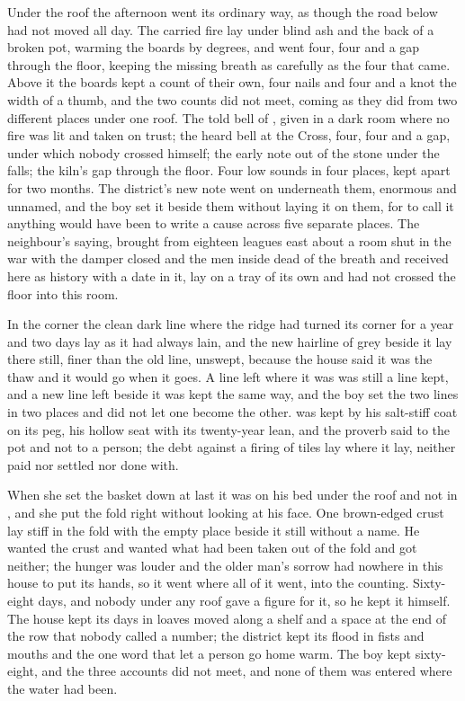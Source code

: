 \scenebreak

Under the  roof the afternoon went its ordinary way, as though the road below had not moved all day. The carried fire lay under blind ash and the back of a broken pot, warming the boards by degrees, and  went four, four and a gap through the floor, keeping the missing breath as carefully as the four that came. Above it the boards kept a count of their own, four nails and four and a knot the width of a thumb, and the two counts did not meet, coming as they did from two different places under one roof. The told bell of , given in a dark room where no fire was lit and taken on trust; the heard bell at the Cross, four, four and a gap, under which nobody crossed himself; the early note out of the stone under the falls; the kiln's gap through the floor. Four low sounds in four places, kept apart for two months. The district's new note went on underneath them, enormous and unnamed, and the boy set it beside them without laying it on them, for to call it anything would have been to write a cause across five separate places. The neighbour's saying, brought from eighteen leagues east about a room shut in the war with the damper closed and the men inside dead of the breath and received here as history with a date in it, lay on a tray of its own and had not crossed the floor into this room.

In the corner the clean dark line where the ridge had turned its corner for a year and two days lay as it had always lain, and the new hairline of grey beside it lay there still, finer than the old line, unswept, because the house said it was the thaw and it would go when it goes. A line left where it was was still a line kept, and a new line left beside it was kept the same way, and the boy set the two lines in two places and did not let one become the other.  was kept by his salt-stiff coat on its peg, his hollow seat with its twenty-year lean, and the proverb said to the pot and not to a person; the debt against a firing of tiles lay where it lay, neither paid nor settled nor done with.

When she set the basket down at last it was on his bed under the roof and not in , and she put the fold right without looking at his face. One brown-edged crust lay stiff in the fold with the empty place beside it still without a name. He wanted the crust and wanted what had been taken out of the fold and got neither; the hunger was louder and the older man's sorrow had nowhere in this house to put its hands, so it went where all of it went, into the counting. Sixty-eight days, and nobody under any roof gave a figure for it, so he kept it himself. The house kept its days in loaves moved along a shelf and a space at the end of the row that nobody called a number; the district kept its flood in fists and mouths and the one word that let a person go home warm. The boy kept sixty-eight, and the three accounts did not meet, and none of them was entered where the water had been.

